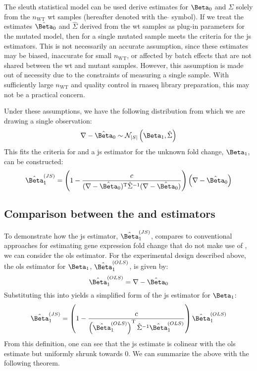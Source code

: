 The sleuth statistical model can be used derive estimates for $\Beta_0$ and $\Sigma$ solely from the $n_\mathrm{WT}$ \gls{wt} samples (hereafter denoted with the $\hat{}$ symbol).
If we treat the estimates $\hat{\Beta}_0$ and $\hat{\Sigma}$ derived from the \gls{wt} samples as plug-in parameters for the mutated model, then  for a single mutated sample meets the criteria for the \gls{js} estimators.
This is not necessarily an accurate assumption, since these estimates may be biased, inaccurate for small $n_\mathrm{WT}$, or affected by batch effects that are not shared between the \gls{wt} and mutant samples.
However, this assumption is made out of necessity due to the constraints of measuring a single sample.
With sufficiently large $n_\mathrm{WT}$ and quality control in \gls{rnaseq} library preparation, this may not be a practical concern.

Under these assumptions, we have the following distribution from which we are drawing a single observation:
%
\begin{equation}
  \nabla - \hat{\Beta}_0 \sim \mathcal{N}_{|S|} \left( \Beta_1, \hat{\Sigma} \right)
  \label{eqn:delta_mut_js_dist}
\end{equation}
%
This fits the criteria for  and a \gls{js} estimator for the unknown fold change, $\Beta_1$, can be constructed:
%
\begin{equation}
  \fcjs = \left( 1 - \frac{c}{(\nabla - \hat{\Beta}_0)^\tran \hat{\Sigma}^{-1} (\nabla - \hat{\Beta}_0)} \right) \left(\nabla - \hat{\Beta}_0 \right)
  \label{eqn:js_defn}
\end{equation}

\subsection{Comparison between the  and  estimators}

To demonstrate how the \gls{js} estimator, $\fcjs$, compares to conventional approaches for estimating gene expression fold change that do not make use of , we can consider the \gls{ols} estimator.
For the experimental design described above, the \gls{ols} estimator for $\Beta_1$, $\fcols$, is given by:
%
\begin{equation}
  \fcols = \nabla - \hat{\Beta}_0
  \label{eqn:ols_defn}
\end{equation}
%
Substituting this into  yields a simplified form of the \gls{js} estimator for $\Beta_1$:
%
\begin{equation}
  \fcjs = \left( 1 - \frac{c}{\left( \fcols \right)^\tran \hat{\Sigma}^{-1} \fcols} \right) \fcols
  \label{eqn:js_defn_ols}
\end{equation}
%
From this definition, one can see that the \gls{js} estimate is colinear with the \gls{ols} estimate but uniformly shrunk towards 0.
We can summarize the above with the following theorem.

